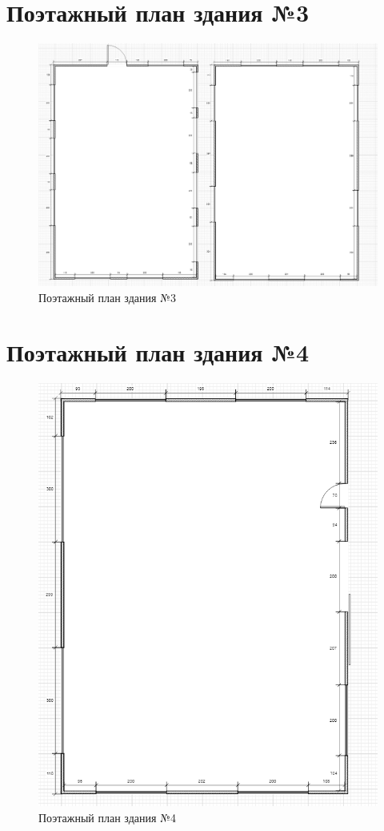 \documentclass[a4paper,14pt,russian]{article}
\begin{document}
\section{Поэтажный план здания №3}
\begin{figure}
  \includegraphics[scale=0.58]{./3-building.png}
 \caption{Поэтажный план здания №3}
\end{figure}
\section{Поэтажный план здания №4}
\begin{figure}
  \includegraphics[scale=0.58]{./4-building.png}
 \caption{Поэтажный план здания №4}
\end{figure}
\end{document}
